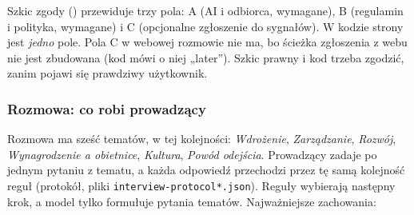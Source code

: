 { Szkic zgody
() przewiduje trzy pola: A (AI i odbiorca,
wymagane), B (regulamin i polityka, wymagane) i C (opcjonalne zgłoszenie do
sygnałów). W kodzie strony jest \emph{jedno} pole. Pola C w webowej rozmowie
nie ma, bo ścieżka zgłoszenia z webu nie jest zbudowana (kod mówi o niej
„later”). Szkic prawny i kod trzeba zgodzić, zanim pojawi się prawdziwy
użytkownik.

\subsubsection{Rozmowa: co robi prowadzący}

Rozmowa ma sześć tematów, w tej kolejności: \emph{Wdrożenie}, \emph{Zarządzanie},
\emph{Rozwój}, \emph{Wynagrodzenie a obietnice}, \emph{Kultura}, \emph{Powód
odejścia}. Prowadzący zadaje po jednym pytaniu z tematu, a każda odpowiedź
przechodzi przez tę samą kolejność reguł (protokół, pliki \texttt{interview-protocol*.json}).
Reguły wybierają następny krok, a model tylko formułuje pytania tematów.
Najważniejsze zachowania:

}
